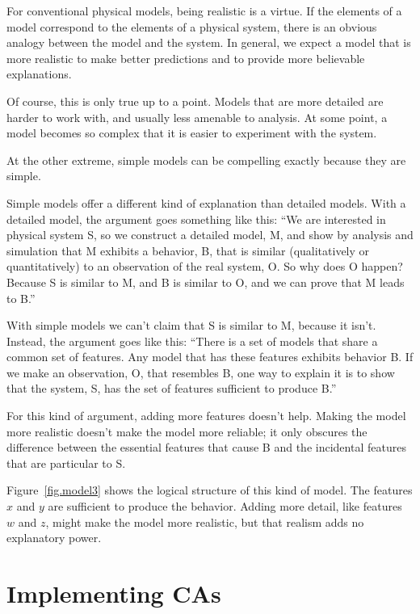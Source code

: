 \documentclass[12pt]{book}
\theoremstyle{exercise}
\begin{document}

For conventional physical models, being realistic is a virtue.  If the elements of a model correspond to the elements of a physical system, there is an obvious analogy between the model and the system.  In general, we expect a model that is more realistic to make better predictions and to provide more believable
explanations.


Of course, this is only true up to a point.  Models that are
more detailed are harder to work with, and usually less
amenable to analysis.  At some point, a model becomes so complex
that it is easier to experiment with the system.

At the other extreme, simple models can be compelling exactly because
they are simple.

Simple models offer a different kind of explanation than detailed
models.  With a detailed model, the argument goes something
like this: ``We are interested in physical system S, so we
construct a detailed model, M, and show by analysis and simulation
that M exhibits a behavior, B, that is similar (qualitatively
or quantitatively) to an observation of the real system, O.
So why does O happen?  Because S is similar to M, and
B is similar to O, and we can prove that M leads to B.''


With simple models we can't claim that S is similar to M, because it
isn't.  Instead, the argument goes like this: ``There is a set of models
that share a common set of features.  Any model that has these
features exhibits behavior B.  If we make an observation, O, that
resembles B, one way to explain it is to show that the system, S, has
the set of features sufficient to produce B.''

For this kind of argument, adding more features doesn't help.  Making
the model more realistic doesn't make the model more reliable; it only
obscures the difference between the essential features that cause B
and the incidental features that are particular to S.

Figure~\ref{fig.model3} shows the logical structure of this kind of
model.  The features $x$ and $y$ are sufficient to produce the
behavior.  Adding more detail, like features $w$ and $z$, might make
the model more realistic, but that realism adds no explanatory power.


\section{Implementing CAs}
\end{document}
